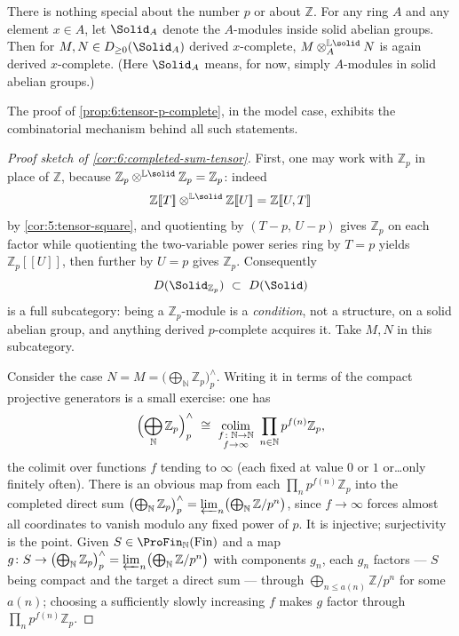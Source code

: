 \begin{remark}
\label{rmk:6:general-ring}
There is nothing special about the number $p$ or about $\mathbb{Z}$. For any ring
$A$ and any element $x\in A$, let $\Solid_{A}$ denote the $A$-modules inside solid
abelian groups. Then for $M,N\in D_{\geq0}(\Solid_{A})$ derived $x$-complete,
$M\otimes^{\mathbb{L}\solid}_{A}N$ is again derived $x$-complete. (Here
$\Solid_{A}$ means, for now, simply $A$-modules in solid abelian groups.)
\end{remark}

The proof of \cref{prop:6:tensor-p-complete}, in the model case, exhibits the
combinatorial mechanism behind all such statements.

\begin{proof}[Proof sketch of \cref{cor:6:completed-sum-tensor}]
First, one may work with $\mathbb{Z}_p$ in place of $\mathbb{Z}$, because
$\mathbb{Z}_p\otimes^{\mathbb{L}\solid}\mathbb{Z}_p=\mathbb{Z}_p$: indeed
\begin{equation*}
\mathbb{Z}[\![T]\!]\otimes^{\mathbb{L}\solid}\mathbb{Z}[\![U]\!]
=\mathbb{Z}[\![U,T]\!]
\end{equation*}
by \cref{cor:5:tensor-square}, and quotienting by $(T-p,\,U-p)$ gives
$\mathbb{Z}_p$ on each factor while quotienting the two-variable power series ring
by $T=p$ yields $\mathbb{Z}_p[\![U]\!]$, then further by $U=p$ gives $\mathbb{Z}_p$.
Consequently
\begin{equation*}
D(\Solid_{\mathbb{Z}_p})\ \subset\ D(\Solid)
\end{equation*}
is a full subcategory: being a $\mathbb{Z}_p$-module is a \emph{condition}, not a
structure, on a solid abelian group, and anything derived $p$-complete acquires
it. Take $M,N$ in this subcategory.

Consider the case $N=M=\bigl(\bigoplus_{\mathbb{N}}\mathbb{Z}_p\bigr)^{\wedge}_{p}$.
Writing it in terms of the compact projective generators is a small exercise: one
has
\begin{equation*}
\Bigl(\bigoplus_{\mathbb{N}}\mathbb{Z}_p\Bigr)^{\wedge}_{p}\ \cong\
\operatorname*{colim}_{\substack{f\colon\mathbb{N}\to\mathbb{N}\\ f\to\infty}}\
\prod_{n\in\mathbb{N}}p^{f(n)}\mathbb{Z}_p ,
\end{equation*}
the colimit over functions $f$ tending to $\infty$ (each fixed at value $0$ or
$1$ or\ldots only finitely often). There is an obvious map from each
$\prod_{n}p^{f(n)}\mathbb{Z}_p$ into the completed direct sum
$\bigl(\bigoplus_{\mathbb{N}}\mathbb{Z}_p\bigr)^{\wedge}_{p}
=\varprojlim_{n}\bigl(\bigoplus_{\mathbb{N}}\mathbb{Z}/p^{n}\bigr)$, since
$f\to\infty$ forces almost all coordinates to vanish modulo any fixed power of
$p$. It is injective; surjectivity is the point. Given
$S\in\ProFin_{\mathbb{N}}(\mathrm{Fin})$ and a map
$g\colon S\to\bigl(\bigoplus_{\mathbb{N}}\mathbb{Z}_p\bigr)^{\wedge}_{p}
=\varprojlim_{n}\bigl(\bigoplus_{\mathbb{N}}\mathbb{Z}/p^{n}\bigr)$ with components
$g_n$, each $g_n$ factors --- $S$ being compact and the target a direct sum ---
through $\bigoplus_{n\leq a(n)}\mathbb{Z}/p^{n}$ for some $a(n)$; choosing a
sufficiently slowly increasing $f$ makes $g$ factor through
$\prod_{n}p^{f(n)}\mathbb{Z}_p$.


\end{proof}
